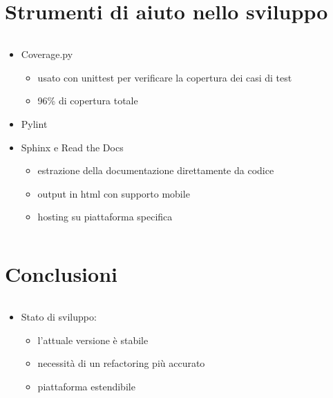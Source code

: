 \documentclass{beamer}
\begin{document}

\section{Strumenti di aiuto nello sviluppo}
\begin{frame}{\secname}
	\begin{columns}
		\begin{column}{\textwidth}
			\begin{itemize}
				\item Coverage.py
					\begin{itemize}
						\item usato con unittest per verificare la copertura dei casi di test
						\item 96\% di copertura totale
					\end{itemize}
				\item Pylint
				\item Sphinx e Read the Docs
					\begin{itemize}
						\item estrazione della documentazione direttamente da codice
						\item output in html con supporto mobile
						\item hosting su piattaforma specifica
					\end{itemize}
			\end{itemize}
		\end{column}
	\end{columns}
\end{frame}


\section{Conclusioni}
\begin{frame}{\secname}
	\begin{columns}
		\begin{column}{\textwidth}
			\begin{itemize}
				\item Stato di sviluppo:
					\begin{itemize}
						\item l'attuale versione è stabile
						\item necessità di un refactoring più accurato
						\item piattaforma estendibile
					\end{itemize}
			\end{itemize}
		\end{column}
	\end{columns}
\end{frame}
	
\end{document}
